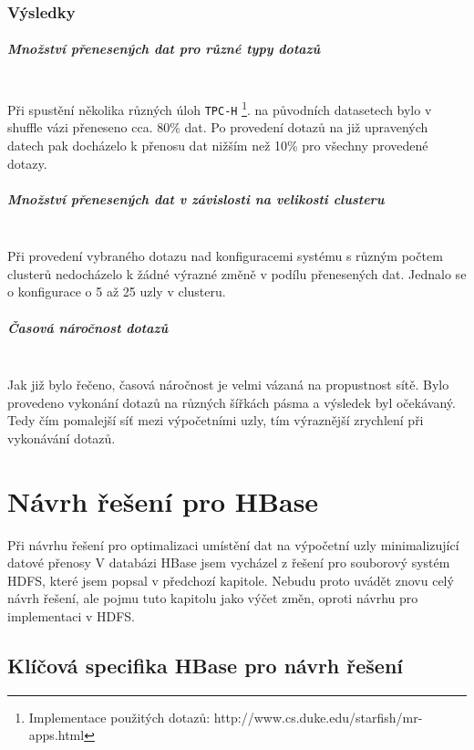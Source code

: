 \documentclass[thesis=M,czech]{FITthesis}[2012/06/26]
\begin{document}
\subsection{Výsledky}

\paragraph{Množství přenesených dat pro různé typy dotazů} \hfill \\
 Při spustění několika různých úloh \texttt{TPC-H} \footnote{Implementace použitých dotazů: http://www.cs.duke.edu/starfish/mr-apps.html}.  na původních datasetech bylo v shuffle vázi přeneseno cca. 80\% dat. Po provedení dotazů na již upravených datech pak docházelo k přenosu dat  nižším než 10\% pro všechny provedené dotazy.

\paragraph{Množství přenesených dat v závislosti na velikosti clusteru} \hfill \\
Při provedení vybraného dotazu nad konfiguracemi systému s různým počtem clusterů nedocházelo k žádné výrazné změně v podílu přenesených dat. Jednalo se o konfigurace o 5 až 25 uzly v clusteru.

\paragraph{Časová náročnost dotazů} \hfill \\
Jak již bylo řečeno, časová náročnost je velmi vázaná na propustnost sítě. Bylo provedeno vykonání dotazů na různých šířkách pásma a výsledek byl očekávaný. Tedy čím pomalejší síť mezi výpočetními uzly, tím výraznější zrychlení při vykonávání dotazů.





\chapter{Návrh řešení pro HBase}
Při návrhu řešení pro optimalizaci umístění dat na výpočetní uzly minimalizující datové přenosy V databázi HBase jsem vycházel z řešení pro souborový systém HDFS, které jsem popsal v předchozí kapitole. Nebudu proto uvádět znovu celý návrh řešení, ale pojmu tuto kapitolu jako výčet změn, oproti návrhu pro implementaci v HDFS. 
\section{Klíčová specifika HBase pro návrh řešení}
\end{document}

